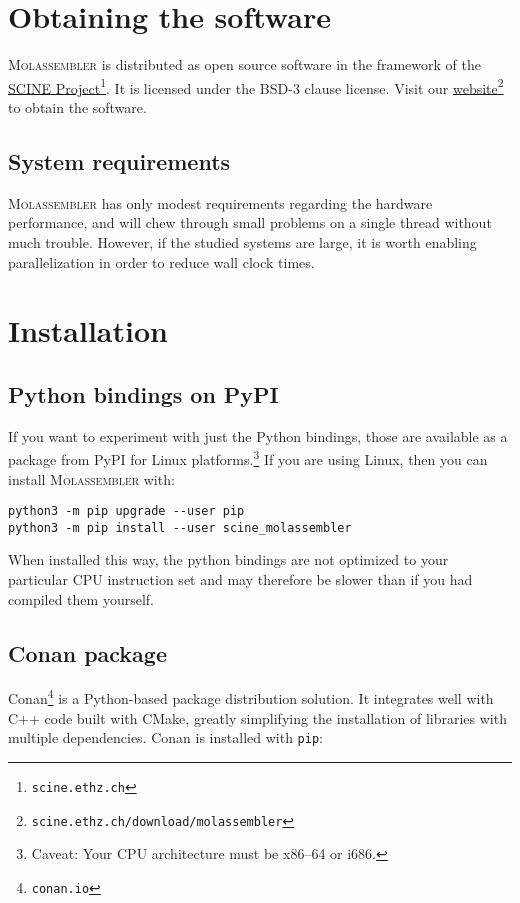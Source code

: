 \documentclass[]{tufte-book}
\begin{document}
\chapter{Obtaining the software}\label{ch:obtain}

\textsc{Molassembler}  is distributed as open source software in the framework
of the \href{https://scine.ethz.ch/}{SCINE
Project}\footnote{\texttt{scine.ethz.ch}}. It is licensed under the BSD-3 clause
license. Visit our
\href{https://scine.ethz.ch/download/molassembler}{website}\footnote{\texttt{scine.ethz.ch/download/molassembler}}
to obtain the software. 


\section{System requirements}

\textsc{Molassembler} has only modest requirements regarding the hardware
performance, and will chew through small problems on a single thread without
much trouble. However, if the studied systems are large, it is worth enabling
parallelization in order to reduce wall clock times.


\chapter{Installation}\label{ch:installation}

\section{Python bindings on PyPI}

If you want to experiment with just the Python bindings, those are available as
a package from PyPI for Linux platforms.\footnote{Caveat: Your CPU architecture
must be x86--64 or i686.} If you are using Linux, then you can install
\textsc{Molassembler} with:

\begin{Verbatim}
python3 -m pip upgrade --user pip
python3 -m pip install --user scine_molassembler
\end{Verbatim}

When installed this way, the python bindings are not optimized to your
particular CPU instruction set and may therefore be slower than if you had
compiled them yourself.

\section{Conan package}
Conan\footnote{\texttt{conan.io}} is a Python-based package distribution
solution. It integrates well with C++ code built with CMake, greatly simplifying
the installation of libraries with multiple dependencies. Conan is installed
with \texttt{pip}:
\end{document}
